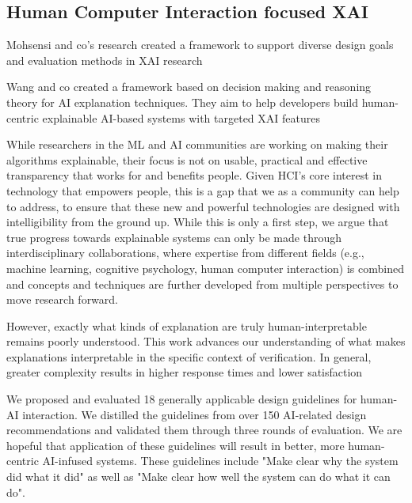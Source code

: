 \documentclass[manuscript,screen,review]{acmart}
\begin{document}
\subsection{Human Computer Interaction focused XAI}\label{subsec:human-computer-interaction-focused-xai}
Mohsensi and co's research created a framework to support diverse design goals and evaluation methods in XAI research\cite{Mohseni2021}


Wang and co created a framework based on decision making and reasoning theory for AI explanation techniques.
They aim to help developers build human-centric explainable AI-based systems with targeted XAI features\cite{Wang2019}

While researchers in the ML and AI communities are working on making their algorithms explainable, their focus is not on usable, practical and effective transparency that works for and
benefits people.
Given HCI’s core interest in technology that empowers people, this is a gap that we as a community can
help to address, to ensure that these new and powerful technologies are designed with intelligibility from the ground up.
While this is only a first step, we argue that true progress
towards explainable systems can only be made through interdisciplinary collaborations, where expertise from different
fields (e.g., machine learning, cognitive psychology, human computer interaction) is combined and concepts and techniques are further developed from multiple perspectives to
move research forward.\cite{Abdul2018}

However, exactly what kinds of explanation are truly human-interpretable remains poorly understood.
This work advances our understanding of what makes explanations interpretable in the specific context of verification.
In general, greater complexity results in higher response times and lower satisfaction\cite{Narayanan2018}

We proposed and evaluated 18 generally applicable design
guidelines for human-AI interaction.
We distilled the guidelines from over 150 AI-related design recommendations and
validated them through three rounds of evaluation.
We are hopeful that application of these guidelines will result in
better, more human-centric AI-infused systems.
These guidelines include "Make clear why the system did what it did" as well as "Make clear how well the system can do what it can
do"\cite{Amershi2019}.
\end{document}
